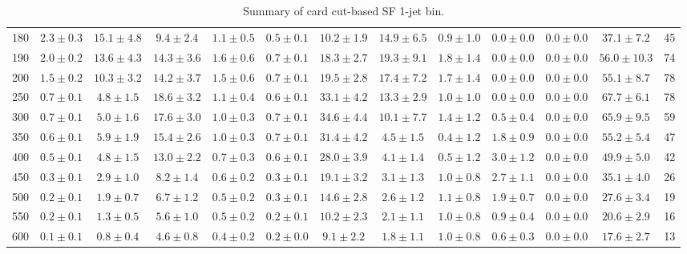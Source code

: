 \begin{table}
{\begin{center}
\begin{tabular}{l | c c | c c c c c c c c  | c c}
180 & $2.3\pm0.3$ & $15.1\pm4.8$ & $9.4\pm2.4$ & $1.1\pm0.5$ & $0.5\pm0.1$ & $10.2\pm1.9$ & $14.9\pm6.5$ & $0.9\pm1.0$ & $0.0\pm0.0$ & $0.0\pm0.0$ & $37.1\pm7.2$ & 45 \\
190 & $2.0\pm0.2$ & $13.6\pm4.3$ & $14.3\pm3.6$ & $1.6\pm0.6$ & $0.7\pm0.1$ & $18.3\pm2.7$ & $19.3\pm9.1$ & $1.8\pm1.4$ & $0.0\pm0.0$ & $0.0\pm0.0$ & $56.0\pm10.3$ & 74 \\
200 & $1.5\pm0.2$ & $10.3\pm3.2$ & $14.2\pm3.7$ & $1.5\pm0.6$ & $0.7\pm0.1$ & $19.5\pm2.8$ & $17.4\pm7.2$ & $1.7\pm1.4$ & $0.0\pm0.0$ & $0.0\pm0.0$ & $55.1\pm8.7$ & 78 \\
250 & $0.7\pm0.1$ & $4.8\pm1.5$ & $18.6\pm3.2$ & $1.1\pm0.4$ & $0.6\pm0.1$ & $33.1\pm4.2$ & $13.3\pm2.9$ & $1.0\pm1.0$ & $0.0\pm0.0$ & $0.0\pm0.0$ & $67.7\pm6.1$ & 78 \\
300 & $0.7\pm0.1$ & $5.0\pm1.6$ & $17.6\pm3.0$ & $1.0\pm0.3$ & $0.7\pm0.1$ & $34.6\pm4.4$ & $10.1\pm7.7$ & $1.4\pm1.2$ & $0.5\pm0.4$ & $0.0\pm0.0$ & $65.9\pm9.5$ & 59 \\
350 & $0.6\pm0.1$ & $5.9\pm1.9$ & $15.4\pm2.6$ & $1.0\pm0.3$ & $0.7\pm0.1$ & $31.4\pm4.2$ & $4.5\pm1.5$ & $0.4\pm1.2$ & $1.8\pm0.9$ & $0.0\pm0.0$ & $55.2\pm5.4$ & 47 \\
400 & $0.5\pm0.1$ & $4.8\pm1.5$ & $13.0\pm2.2$ & $0.7\pm0.3$ & $0.6\pm0.1$ & $28.0\pm3.9$ & $4.1\pm1.4$ & $0.5\pm1.2$ & $3.0\pm1.2$ & $0.0\pm0.0$ & $49.9\pm5.0$ & 42 \\
450 & $0.3\pm0.1$ & $2.9\pm1.0$ & $8.2\pm1.4$ & $0.6\pm0.2$ & $0.3\pm0.1$ & $19.1\pm3.2$ & $3.1\pm1.3$ & $1.0\pm0.8$ & $2.7\pm1.1$ & $0.0\pm0.0$ & $35.1\pm4.0$ & 26 \\
500 & $0.2\pm0.1$ & $1.9\pm0.7$ & $6.7\pm1.2$ & $0.5\pm0.2$ & $0.3\pm0.1$ & $14.6\pm2.8$ & $2.6\pm1.2$ & $1.1\pm0.8$ & $1.9\pm0.7$ & $0.0\pm0.0$ & $27.6\pm3.4$ & 19 \\
550 & $0.2\pm0.1$ & $1.3\pm0.5$ & $5.6\pm1.0$ & $0.5\pm0.2$ & $0.2\pm0.1$ & $10.2\pm2.3$ & $2.1\pm1.1$ & $1.0\pm0.8$ & $0.9\pm0.4$ & $0.0\pm0.0$ & $20.6\pm2.9$ & 16 \\
600 & $0.1\pm0.1$ & $0.8\pm0.4$ & $4.6\pm0.8$ & $0.4\pm0.2$ & $0.2\pm0.0$ & $9.1\pm2.2$ & $1.8\pm1.1$ & $1.0\pm0.8$ & $0.6\pm0.3$ & $0.0\pm0.0$ & $17.6\pm2.7$ & 13 \\
\hline
\end{tabular}
\end{center}
}
\caption{Summary of card cut-based SF 1-jet bin.}
\end{table}
